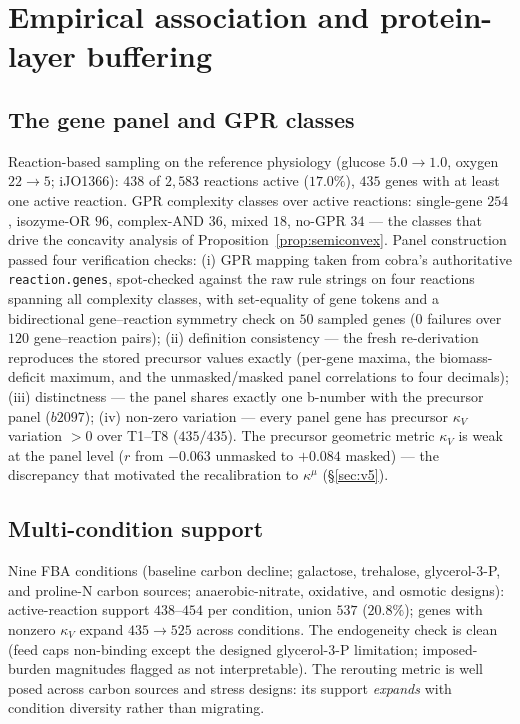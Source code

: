\documentclass[11pt,a4paper]{article}
\theoremstyle{plain}
\theoremstyle{definition}
\theoremstyle{remark}
\newcommand{\kk}{\kappa_{\!V}}
\newcommand{\kmu}{\kappa^{\mu}}
\begin{document}
\section{Empirical association and protein-layer buffering}
\label{sec:empirical}



\subsection{The gene panel and GPR classes}
\label{sec:e22}
Reaction-based sampling on the reference physiology (glucose $5.0 \to 1.0$, oxygen $22 \to 5$; iJO1366): $438$ of
$2{,}583$ reactions active ($17.0\%$), $435$ genes with at least one
active reaction. GPR complexity classes over active reactions:
single-gene $254$, isozyme-OR $96$, complex-AND $36$, mixed $18$,
no-GPR $34$ --- the classes that drive the concavity analysis of
Proposition~\ref{prop:semiconvex}. Panel construction passed four
verification checks: (i) GPR mapping taken from cobra's authoritative
\texttt{reaction.genes}, spot-checked against the raw rule strings on
four reactions spanning all complexity classes, with set-equality of
gene tokens and a bidirectional gene--reaction symmetry check on $50$
sampled genes ($0$ failures over $120$ gene--reaction pairs); (ii)
definition consistency --- the fresh re-derivation reproduces the
stored precursor values exactly (per-gene maxima, the biomass-deficit
maximum, and the unmasked/masked panel correlations to four
decimals); (iii) distinctness --- the panel shares exactly one b-number with the precursor panel ($b2097$); (iv) non-zero variation ---
every panel gene has precursor $\kappa_V$ variation $> 0$ over T1--T8
($435/435$). The precursor geometric metric $\kk$ is weak at the panel
level ($r$ from $-0.063$ unmasked to $+0.084$ masked) --- the discrepancy that motivated the recalibration to $\kmu$ (\S\ref{sec:v5}).

\subsection{Multi-condition support}
\label{sec:e23}
Nine FBA conditions (baseline carbon decline; galactose, trehalose,
glycerol-3-P, and proline-N carbon sources; anaerobic-nitrate,
oxidative, and osmotic designs): active-reaction support $438$--$454$
per condition, union $537$ ($20.8\%$); genes with nonzero $\kk$
expand $435 \to 525$ across conditions. The endogeneity check is clean (feed caps non-binding except the designed glycerol-3-P
limitation; imposed-burden magnitudes flagged as not interpretable).
The rerouting metric is well posed across carbon sources and stress
designs: its support \emph{expands} with condition diversity rather
than migrating.
\end{document}
